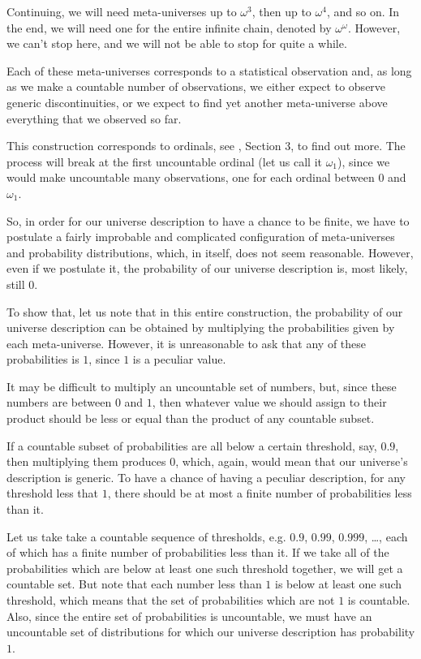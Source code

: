 \documentclass[a4paper
,draft
]{article}
\begin{document}
Continuing, we will need meta-universes up to $\omega^3$, then up to
$\omega^4$, and so on.
In the end, we will need one for the entire
infinite chain, denoted by $\omega^\omega$.
However, we can't stop here, and we will not be able to stop for quite a while.

Each of these meta-universes corresponds to a statistical observation and,
as long as we make a countable number of observations, we either expect to
observe generic discontinuities, or we expect to find yet another meta-universe
above everything that we observed so far.

This construction corresponds to ordinals, see \textcite{Cohen1966}, Section 3,
to find out more.
The process will break at the first uncountable ordinal (let us call it
$\omega_1$), since we would make
uncountable many observations, one for each ordinal between $0$ and $\omega_1$.

So, in order for our universe description to have a chance to be finite,
we have to postulate a fairly improbable and complicated configuration
of meta-universes and probability distributions, which,
in itself, does not seem reasonable.
However, even if we postulate it, the probability of our universe description
is, most likely, still $0$.

To show that, let us note that in this entire construction,
the probability of our universe description can be obtained by multiplying the
probabilities given by each meta-universe. However, it is unreasonable
to ask that any of these probabilities is $1$, since $1$ is a peculiar value.

It may be difficult to multiply an uncountable set of numbers, but,
since these numbers are between $0$ and $1$, then whatever value we should
assign to their product
should be less or equal than the product of any countable subset.

If a countable subset of probabilities are all below a certain threshold,
say, $0.9$, then multiplying them produces $0$, which, again, would mean
that our universe's description is generic. To have a chance of having
a peculiar description, for any threshold less that $1$, there should be at
most a finite number of probabilities less than it.

Let us take take a countable sequence of thresholds, e.g.
$0.9$, $0.99$, $0.999$, \dots, each of which has a finite number of
probabilities less than it.
If we take all of the probabilities which are below at least
one such threshold together, we will get a countable set.
But note that each number less than $1$ is below at least one such threshold,
which means that the set of
probabilities which are not $1$ is countable.
Also, since the entire set of
probabilities is uncountable, we must have an uncountable set of distributions
for which our universe description has probability $1$.
\end{document}
